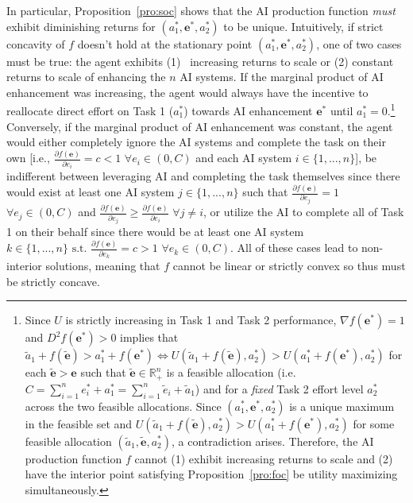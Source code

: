\documentclass[11pt]{article}
\theoremstyle{definition}
\theoremstyle{remark}
\begin{document}
In particular, Proposition~\ref{pro:soc} shows that the AI production function \textit{must} exhibit diminishing returns for $(a^*_1,\mathbf{e}^*,a^*_2)$ to be unique. Intuitively, if strict concavity of $f$ doesn't hold at the stationary point $(a^*_1,\mathbf{e}^*,a^*_2)$, one of two cases must be true: the agent exhibits (1)  increasing returns to scale or (2) constant returns to scale of enhancing the $n$ AI systems. If the marginal product of AI enhancement was increasing, the agent would always have the incentive to reallocate direct effort on Task 1 ($a^*_1$) towards AI enhancement $\mathbf{e}^*$ until $a^*_1=0$.\footnote{Since $U$ is strictly increasing in Task 1 and Task 2 performance, $\nabla f(\mathbf{e}^*)=1$ and $D^2 f(\mathbf{e}^*)>0$ implies that $\tilde{a}_1+f(\tilde{\mathbf{e}})>a_1^*+f({\mathbf{e}^*})\iff U(\tilde{a}_1+f(\tilde{\mathbf{e}}),a_2^*)>U({a}_1^*+f({\mathbf{e}}^*),a_2^*)$ for each $\tilde{\mathbf{e}}>\mathbf{e}$ such that $\tilde{\mathbf{e}}\in\mathbb{R}^n_+$ is a feasible allocation (i.e. $C=\sum_{i=1}^n{e}^*_i+{a}^*_1=\sum_{i=1}^n\tilde{e}_i+\tilde{a}_1$) and for a \textit{fixed} Task 2 effort level $a^*_2$ across the two feasible allocations. Since $(a^*_1,\mathbf{e}^*,a^*_2)$ is a unique maximum in the feasible set and $U(\tilde{a}_1+f(\tilde{\mathbf{e}}),a_2^*)>U({a}_1^*+f({\mathbf{e}}^*),a_2^*)$ for some feasible allocation $(\tilde{a}_1,\tilde{\mathbf{e}},{a}_2^*)$, a contradiction arises. Therefore, the AI production function $f$ cannot (1) exhibit increasing returns to scale and (2) have the interior point satisfying Proposition~\ref{pro:foc} be utility maximizing simultaneously.} Conversely, if the marginal product of AI enhancement was constant, the agent would either completely ignore the AI systems and complete the task on their own [i.e., $\frac{\partial f(\mathbf{e})}{\partial e_i}=c<1$ $\forall e_i\in (0,C)$ and each AI system $i\in\{1,...,n\}$], be indifferent between leveraging AI and completing the task themselves since there would exist at least one AI system $j\in\{1,...,n\}$ such that $\frac{\partial f(\mathbf{e})}{\partial e_j}=1$ $\forall e_j\in(0,C)$ and $\frac{\partial f(\mathbf{e})}{\partial e_j}\geq\frac{\partial f(\mathbf{e})}{\partial e_i}$ $\forall j\neq i$, or utilize the AI to complete all of Task 1 on their behalf since there would be at least one AI system $ k\in\{1,...,n\}\text{ s.t. }\frac{\partial f(\mathbf{e})}{\partial e_k}=c>1$ $\forall e_k\in (0,C)$. All of these cases lead to non-interior solutions, meaning that $f$ cannot be linear or strictly convex so thus must be strictly concave.
\end{document}
